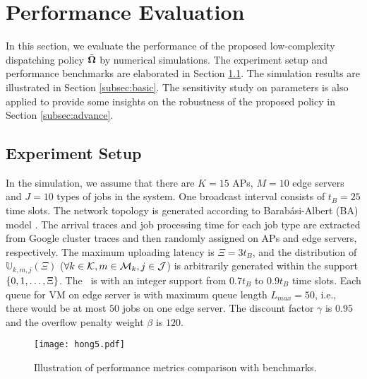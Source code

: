 \section{Performance Evaluation}
\label{sec:evaluation}
In this section, we evaluate the performance of the proposed low-complexity dispatching policy $\tilde{\boldsymbol{\Omega}}$ by numerical simulations.
The experiment setup and performance benchmarks are elaborated in Section \ref{subsec:setup}.
The simulation results are illustrated in Section \ref{subsec:basic}.
The sensitivity study on parameters is also applied to provide some insights on the robustness of the proposed policy in Section \ref{subsec:advance}.

\subsection{Experiment Setup}
\label{subsec:setup}
In the simulation, we assume that there are $K=15$ APs, $M=10$ edge servers and $J=10$ types of jobs in the system.
One broadcast interval consists of $t_{B}=25$ time slots.
The network topology is generated according to Barab\'asi-Albert (BA) model \cite{albert1999diameter}.
The arrival traces and job processing time for each job type are extracted from Google cluster traces \cite{clusterdata:Reiss2011} and then randomly assigned on APs and edge servers, respectively.
The maximum uploading latency is $\Xi = 3t_B$, and the distribution of $\mathbb{U}_{k,m,j}(\Xi)$ ($\forall k\in\mathcal{K}, m\in\mathcal{M}_{k}, j\in\mathcal{J}$) is arbitrarily generated within the support $\{0, 1, \dots, \Xi\}$.
The \brlatency~is with an integer support from $0.7t_B$ to $0.9t_B$ time slots.
Each queue for VM on edge server is with maximum queue length $L_{max}=50$, i.e., there would be at most $50$ jobs on one edge server.
The discount factor $\gamma$ is $0.95$ and the overflow penalty weight $\beta$ is $120$.

\begin{figure}[ht]                                                      %
    \centering                                                          %
    \texttt{[image: hong5.pdf]}               %
    \caption{Illustration of performance metrics comparison with benchmarks.}
    \label{fig:bar_plot}                                                %
\end{figure}                                                            %

